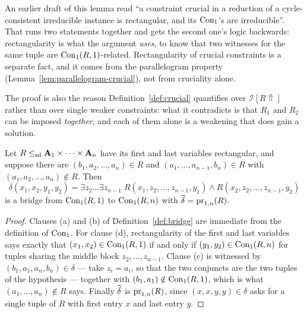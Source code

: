 \begin{hazard}\label{haz:crucial-irreducible}
An earlier draft of this lemma read ``a constraint crucial in a reduction of a
cycle-consistent irreducible instance is rectangular, and its $\operatorname{Con}_1$'s are
irreducible''. That runs two statements together and gets the second one's
logic backwards: rectangularity is what the argument \emph{uses}, to know that
two witnesses for the same tuple are $\operatorname{Con}_1(R,1)$-related. Rectangularity of
crucial constraints is a separate fact, and it comes from the parallelogram
property (Lemma~\ref{lem:parallelogram-crucial}), not from cruciality alone.

The proof is also the reason Definition~\ref{def:crucial} quantifies over
$\mathcal I[R\Uparrow]$ rather than over single weaker constraints: what it
contradicts is that $R_{1}$ and $R_{2}$ can be imposed \emph{together}, and
each of them alone is a weakening that does gain a solution.
\end{hazard}

\begin{lemma}\label{lem:bridge-from-relation}
Let $R\le_{\mathrm{sd}}\mathbf A_{1}\times\dots\times\mathbf A_{n}$ have its first and last
variables rectangular, and suppose there are
$(b_{1},a_{2},\dots,a_{n})\in R$ and $(a_{1},\dots,a_{n-1},b_{n})\in R$ with
$(a_{1},a_{2},\dots,a_{n})\notin R$. Then
\[
  \delta(x_{1},x_{2},y_{1},y_{2})=\exists z_{2}\dots\exists z_{n-1}\;
    R(x_{1},z_{2},\dots,z_{n-1},y_{1})\wedge
    R(x_{2},z_{2},\dots,z_{n-1},y_{2})
\]
is a bridge from $\operatorname{Con}_1(R,1)$ to $\operatorname{Con}_1(R,n)$ with
$\widetilde{\delta}=\operatorname*{pr}_{1,n}(R)$.
\end{lemma}

\begin{proof}
Clauses (a) and (b) of Definition~\ref{def:bridge} are immediate from the
definition of $\operatorname{Con}_1$. For clause (d), rectangularity of the first and last
variables says exactly that $(x_{1},x_{2})\in\operatorname{Con}_1(R,1)$ if and only if
$(y_{1},y_{2})\in\operatorname{Con}_1(R,n)$ for tuples sharing the middle block
$z_{2},\dots,z_{n-1}$. Clause (c) is witnessed by
$(b_{1},a_{1},a_{n},b_{n})\in\delta$ --- take
$z_{i}=a_{i}$, so that the two conjuncts are the two tuples of the hypothesis
--- together with $(b_{1},a_{1})\notin\operatorname{Con}_1(R,1)$, which is what
$(a_{1},\dots,a_{n})\notin R$ says. Finally $\widetilde{\delta}$ is $\operatorname*{pr}_{1,n}(R)$,
since $(x,x,y,y)\in\delta$ asks for a single tuple of $R$ with first entry $x$
and last entry $y$.
\end{proof}

